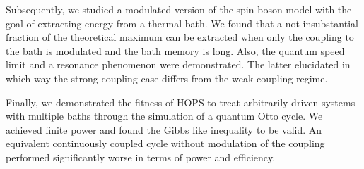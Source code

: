 Subsequently, we studied a modulated version of the spin-boson model
with the goal of extracting energy from a thermal bath. We found that
a not insubstantial fraction of the theoretical maximum can be
extracted when only the coupling to the bath is modulated and the bath
memory is long. Also, the quantum speed limit and a resonance
phenomenon were demonstrated. The latter elucidated in which way the
strong coupling case differs from the weak coupling regime.

Finally, we demonstrated the fitness of HOPS to treat arbitrarily
driven systems with multiple baths through the simulation of a quantum
Otto cycle. We achieved finite power and found the Gibbs like
inequality to be valid. An equivalent continuously coupled cycle
without modulation of the coupling performed significantly worse in
terms of power and efficiency.
